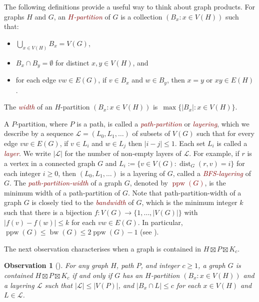 \documentclass[11pt]{article}
\newcommand{\defn}[1]{\textcolor{Maroon}{\emph{#1}}}
\renewcommand{\geq}{\geqslant}
\renewcommand{\leq}{\leqslant}
\newcommand{\StrongProd}{\mathbin{\boxtimes}}
\DeclareMathOperator{\dist}{dist}
\DeclareMathOperator{\ppw}{ppw}
\DeclareMathOperator{\bw}{bw}
\theoremstyle{plain}
\newtheorem{obs}[thm]{Observation}
\theoremstyle{definition}
\newcommand{\PP}{\mathcal{P}}
\newcommand{\LL}{\mathcal{L}}
\begin{document}
		The following definitions  provide a useful way to think about graph products. 
		For graphs $H$ and $G$, an \defn{$H$-partition} of $G$ is a collection $(B_x:x\in V(H))$ such that:
		\begin{itemize}
			\item $\bigcup_{x\in V(H)} B_x=V(G)$, 
			\item $B_x\cap B_y=\emptyset$ for distinct $x,y\in V(H)$, and
			\item for each edge $vw\in E(G)$, if $v\in B_x$ and $w\in B_y$, then $x=y$ or $xy\in E(H)$. 
		\end{itemize}
		The \defn{width} of an $H$-partition $(B_x:x\in V(H))$ is~${\max\{ |{B_x}| \colon x \in V(H)\}}$. 
		
		A $P$-partition, where $P$ is a path, is called a \defn{path-partition} or \defn{layering}, which we describe by a sequence $\LL=(L_0,L_1,\dots)$ of subsets of $V(G)$ such that for every edge $vw\in E(G)$, if $v\in L_i$ and $w\in L_j$ then $|i-j|\leq 1$. Each set $L_i$ is called a \defn{layer}. We write $|\mathcal{L}|$ for the number of non-empty layers of $\mathcal{L}$. For example, if $r$ is a vertex in a connected graph $G$ and $L_i:=\{v\in V(G):\dist_G(r,v)=i\}$ for each integer $i\geq 0$, then $(L_0,L_1,\dots)$ is a layering of $G$, called  a \defn{BFS-layering} of $G$.
		The \defn{path-partition-width} of a graph $G$, denoted by \defn{$\ppw(G)$}, is the minimum width of a path-partition of $G$. Note that path-partition-width of a graph $G$ is closely tied to the \defn{bandwidth} of $G$, which is the minimum integer $k$ such that there is a bijection $f:V(G)\rightarrow\{1,\dots,|V(G)|\}$ with $|f(v)-f(w)|\leq k$ for each $vw\in E(G)$. In particular, $\ppw(G)\leq\bw(G) \leq 2\ppw(G)-1$ (see \citep{DJMMW25,BPTW10}).
		
		The next observation characterises when a graph is contained in $H \StrongProd P \StrongProd K_c$. 
		
		\begin{obs}[\citep{DJMMUW20}]
			\label{PartitionProduct}
			For any graph $H$, path $P$, and  integer $c\geq 1$, a graph $G$ is contained $H\StrongProd P \StrongProd K_c$ if and only if $G$ has an $H$-partition $(B_x:x\in V(H))$ and a layering $\LL$ such that $|\LL|\leq|V(P)|$, 
			and $|B_x\cap L|\leq c$ for each $x\in V(H)$ and $L\in\LL$. 
		\end{obs}
		
\end{document}
